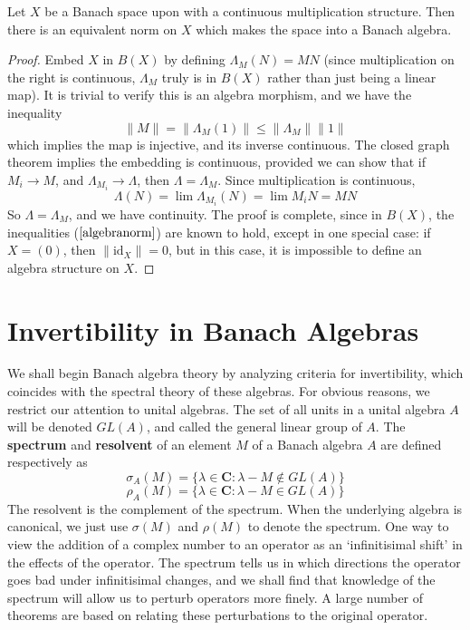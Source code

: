 \begin{prop}
    Let $X$ be a Banach space upon with a continuous multiplication structure. Then there is an equivalent norm on $X$ which makes the space into a Banach algebra.
\end{prop}
\begin{proof}
    Embed $X$ in $B(X)$ by defining $\Lambda_M(N) = MN$ (since multiplication on the right is continuous, $\Lambda_M$ truly is in $B(X)$ rather than just being a linear map). It is trivial to verify this is an algebra morphism, and we have the inequality
    \begin{equation} \label{embedinequality} \| M \| = \| \Lambda_M (1) \| \leq \| \Lambda_M \| \| 1 \| \end{equation}
    which implies the map is injective, and its inverse continuous. The closed graph theorem implies the embedding is continuous, provided we can show that if $M_i \to M$, and $\Lambda_{M_i} \to \Lambda$, then $\Lambda = \Lambda_M$. Since multiplication is continuous,
    \[ \Lambda(N) = \lim \Lambda_{M_i}(N) = \lim M_iN = MN \]
    So $\Lambda = \Lambda_M$, and we have continuity. The proof is complete, since in $B(X)$, the inequalities ($\ref{algebranorm}$) are known to hold, except in one special case: if $X = (0)$, then $\| \text{id}_X \| = 0$, but in this case, it is impossible to define an algebra structure on $X$.
\end{proof}

\section{Invertibility in Banach Algebras}

We shall begin Banach algebra theory by analyzing criteria for invertibility, which coincides with the spectral theory of these algebras. For obvious reasons, we restrict our attention to unital algebras. The set of all units in a unital algebra $A$ will be denoted $GL(A)$, and called the general linear group of $A$. The {\bf spectrum} and {\bf resolvent} of an element $M$ of a Banach algebra $A$ are defined respectively as
%
\[ \sigma_{A}(M) = \{ \lambda \in \mathbf{C} : \lambda - M \not \in GL(A) \} \]
%
\[ \rho_{A}(M) = \{ \lambda \in \mathbf{C} : \lambda - M \in GL(A) \} \]
%
The resolvent is the complement of the spectrum. When the underlying algebra is canonical, we just use $\sigma(M)$ and $\rho(M)$ to denote the spectrum. One way to view the addition of a complex number to an operator as an `infinitisimal shift' in the effects of the operator. The spectrum tells us in which directions the operator goes bad under infinitisimal changes, and we shall find that knowledge of the spectrum will allow us to perturb operators more finely. A large number of theorems are based on relating these perturbations to the original operator.

